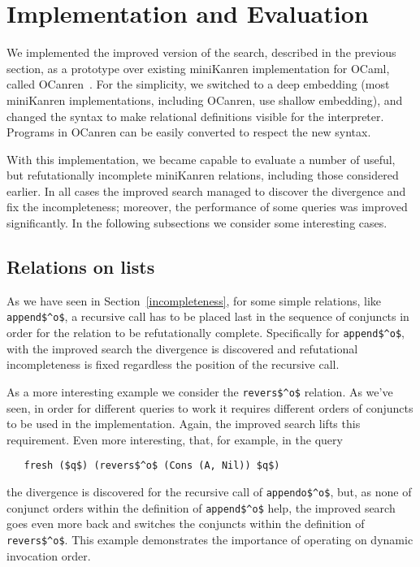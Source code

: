\section{Implementation and Evaluation}
\label{evaluation}

We implemented the improved version of the search, described in the previous section, 
as a prototype over existing miniKanren implementation for OCaml, called OCanren~\cite{OCanren}. 
For the simplicity, we switched to a deep embedding (most miniKanren implementations, 
including OCanren, use shallow embedding), and changed the syntax to make relational definitions
visible for the interpreter. Programs in OCanren can be easily converted to respect 
the new syntax.

With this implementation, we became capable to evaluate a number of useful, but refutationally 
incomplete miniKanren relations, including those considered earlier. In all cases the 
improved search managed to discover the divergence and fix the incompleteness; moreover, 
the performance of some queries was improved significantly. In the following subsections
we consider some interesting cases.

\subsection{Relations on lists}

As we have seen in Section~\ref{incompleteness}, for some simple relations, like \lstinline|append$^o$|,
a recursive call has to be placed last in the sequence of conjuncts in order for the 
relation to be refutationally complete. Specifically for \lstinline|append$^o$|, with the improved search 
the divergence is discovered and refutational incompleteness is fixed regardless the position of 
the recursive call.

As a more interesting example we consider the \lstinline|revers$^o$| relation. As we've
seen, in order for different queries to work it requires different orders of conjuncts 
to be used in the implementation. Again, the improved search lifts this requirement.
Even more interesting, that, for example, in the query 

\begin{lstlisting}
   fresh ($q$) (revers$^o$ (Cons (A, Nil)) $q$)
\end{lstlisting}

\noindent the divergence is discovered for the recursive call of \lstinline|appendo$^o$|, but,
as none of conjunct orders within the definition of \lstinline|append$^o$| help, the
improved search goes even more back and switches the conjuncts within the definition of
\lstinline|revers$^o$|. This example demonstrates the importance of operating on 
dynamic invocation order.

